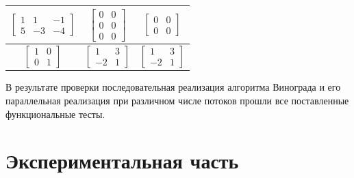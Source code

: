 \documentclass[12pt, a4paper]{report}
\begin{document}
\begin{table}[ht!]
\begin{center}
\begin{tabular}{|c|c|c|}
			$\begin{bmatrix}1 & 1 & -1\\5 & -3 & -4\end{bmatrix}$ &
			$\begin{bmatrix}0 & 0\\0 & 0\\0 & 0\end{bmatrix}$ &
			$\begin{bmatrix}0 & 0\\0 & 0\end{bmatrix}$\\\hline
			
			$\begin{bmatrix}1 & 0\\0 & 1\end{bmatrix}$ &
			$\begin{bmatrix}1 & 3\\-2 & 1\end{bmatrix}$ &
			$\begin{bmatrix}1 & 3\\-2 & 1\end{bmatrix}$\\\hline

			\end{tabular}
		\end{center}
	\end{table}

	В результате проверки последовательная реализация алгоритма Винограда и его параллельная реализация при различном числе потоков прошли все поставленные функциональные тесты.

	\chapter{Экспериментальная часть}
\end{document}
